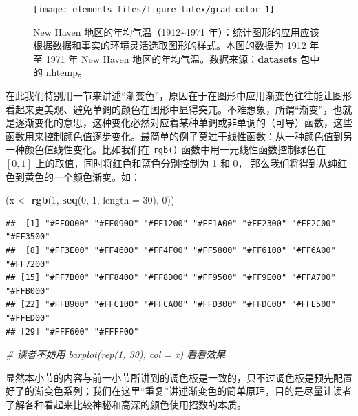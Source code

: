 \documentclass[
  b5paper,
  UTF8,twoside]{book}
\newenvironment{Shaded}{\begin{snugshade}}{\end{snugshade}}
\newcommand{\AttributeTok}[1]{\textcolor[rgb]{0.13,0.29,0.53}{#1}}
\newcommand{\CommentTok}[1]{\textcolor[rgb]{0.56,0.35,0.01}{\textit{#1}}}
\newcommand{\DecValTok}[1]{\textcolor[rgb]{0.00,0.00,0.81}{#1}}
\newcommand{\FunctionTok}[1]{\textcolor[rgb]{0.13,0.29,0.53}{\textbf{#1}}}
\newcommand{\NormalTok}[1]{#1}
\newcommand{\OtherTok}[1]{\textcolor[rgb]{0.56,0.35,0.01}{#1}}
\begin{document}
\begin{figure}

{\centering \texttt{[image: elements\_files/figure-latex/grad-color-1]} 

}

\caption[New Haven 地区的年均气温（1912~1971 年）]{New Haven 地区的年均气温（1912\textasciitilde1971 年）：统计图形的应用应该根据数据和事实的环境灵活选取图形的样式。本图的数据为 1912 年至 1971 年 New Haven 地区的年均气温。数据来源：\textbf{datasets} 包中的 nhtemp。}\label{fig:grad-color}
\end{figure}



在此我们特别用一节来讲述``渐变色''，原因在于在图形中应用渐变色往往能让图形看起来更美观、避免单调的颜色在图形中显得突兀。不难想象，所谓``渐变''，也就是逐渐变化的意思，这种变化必然对应着某种单调或非单调的（可导）函数，这些函数用来控制颜色值逐步变化。最简单的例子莫过于线性函数：从一种颜色值到另一种颜色值线性变化。比如我们在 \texttt{rgb()} 函数中用一元线性函数控制绿色在 \([0, 1]\) 上的取值，同时将红色和蓝色分别控制为 1 和 0， 那么我们将得到从纯红色到黄色的一个颜色渐变。如：

\begin{Shaded}
\begin{Highlighting}[]
\NormalTok{(x }\OtherTok{\textless{}{-}} \FunctionTok{rgb}\NormalTok{(}\DecValTok{1}\NormalTok{, }\FunctionTok{seq}\NormalTok{(}\DecValTok{0}\NormalTok{, }\DecValTok{1}\NormalTok{, }\AttributeTok{length =} \DecValTok{30}\NormalTok{), }\DecValTok{0}\NormalTok{))}
\end{Highlighting}
\end{Shaded}

\begin{verbatim}
##  [1] "#FF0000" "#FF0900" "#FF1200" "#FF1A00" "#FF2300" "#FF2C00" "#FF3500"
##  [8] "#FF3E00" "#FF4600" "#FF4F00" "#FF5800" "#FF6100" "#FF6A00" "#FF7200"
## [15] "#FF7B00" "#FF8400" "#FF8D00" "#FF9500" "#FF9E00" "#FFA700" "#FFB000"
## [22] "#FFB900" "#FFC100" "#FFCA00" "#FFD300" "#FFDC00" "#FFE500" "#FFED00"
## [29] "#FFF600" "#FFFF00"
\end{verbatim}

\begin{Shaded}
\begin{Highlighting}[]
\CommentTok{\# 读者不妨用 barplot(rep(1, 30), col = x) 看看效果}
\end{Highlighting}
\end{Shaded}

显然本小节的内容与前一小节所讲到的调色板是一致的，只不过调色板是预先配置好了的渐变色系列；我们在这里``重复''讲述渐变色的简单原理，目的是尽量让读者了解各种看起来比较神秘和高深的颜色使用招数的本质。
\end{document}
